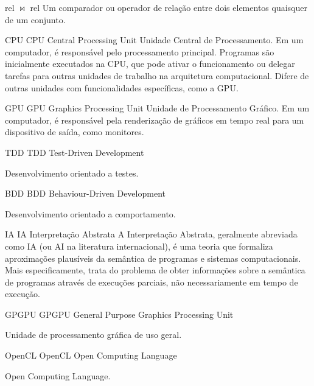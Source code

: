

\novosimbolo
    {rel} %
    {\ensuremath{\bowtie}} %
    {rel} %
    {
        Um comparador ou operador de relação entre dois elementos quaisquer de 
        um conjunto.
    } %



\novoacronimo
    {CPU}
    {CPU}
    {{Central Processing Unit}}
    {
        Unidade Central de Processamento. Em um computador, é responsável pelo 
        processamento principal. Programas são inicialmente executados na CPU, 
        que pode ativar o funcionamento ou delegar tarefas para outras unidades 
        de trabalho na arquitetura computacional. Difere de outras unidades com 
        funcionalidades específicas, como a \gls{GPU}.
    }

\novoacronimo
    {GPU}
    {GPU}
    {{Graphics Processing Unit}}
    {
        Unidade de Processamento Gráfico. Em um computador, é responsável pela 
        renderização de gráficos em tempo real para um dispositivo de saída, 
        como monitores.
    }
    
    
\novoacronimo
    {TDD}
    {TDD}
    {{Test-Driven Development}}
    {
        Desenvolvimento orientado a testes.
        
    }
    
\novoacronimo
    {BDD}
    {BDD}
    {{Behaviour-Driven Development}}
    {
        Desenvolvimento orientado a comportamento.
        
    }
    
\novoacronimo
    {IA} %
    {IA} %
    {{Interpretação Abstrata}} %
    {
        A Interpretação Abstrata, geralmente abreviada como IA (ou AI na 
        literatura internacional), é uma teoria que formaliza aproximações 
        plausíveis da semântica de programas e sistemas computacionais. Mais 
        especificamente, trata do problema de obter informações sobre a 
        semântica de programas através de execuções parciais, não 
        necessariamente em tempo de execução.
    }

\novoacronimo
    {GPGPU}
    {GPGPU}
    {{General Purpose Graphics Processing Unit}}
    {
        Unidade de processamento gráfica de uso geral.
                
    }


\novoacronimo
    {OpenCL}
    {OpenCL}
    {{Open Computing Language}}
    {
        Open Computing Language.
                
    }
    
